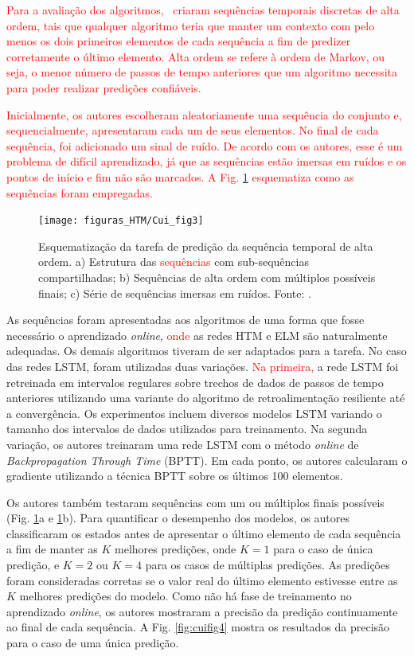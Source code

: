 \textcolor{red}{Para a avaliação dos algoritmos, \cui \ criaram sequências temporais discretas de alta ordem, tais que qualquer algoritmo teria que manter um contexto com pelo menos os dois primeiros elementos de cada  sequência a fim de predizer corretamente o último elemento. Alta ordem se refere à ordem de Markov, ou seja, o menor número de passos de tempo anteriores que um algoritmo necessita para poder realizar predições confiáveis.}

\textcolor{red}{Inicialmente, os autores escolheram aleatoriamente uma sequência do conjunto e, sequencialmente, apresentaram cada um de seus elementos. No final de cada sequência, foi adicionado um sinal de ruído. De acordo com os autores, esse é um problema de difícil aprendizado, já que as sequências estão imersas em ruídos e os pontos de início e fim não são marcados. A Fig. \ref{fig:cuifig3} esquematiza como as sequências foram empregadas.}

\begin{figure}[H]
	\centering
	\texttt{[image: figuras\_HTM/Cui\_fig3]}
	\caption{Esquematização da tarefa de predição da sequência temporal de alta ordem. a) Estrutura das \textcolor{red}{sequências} com sub-sequências compartilhadas; b) Sequências de alta ordem com múltiplos possíveis finais; c) Série de sequências imersas em ruídos. Fonte: \cui.}
	\label{fig:cuifig3}
\end{figure}

As sequências foram apresentadas aos algoritmos de uma forma que fosse necessário o aprendizado \textit{online}, \textcolor{red}{onde} as redes HTM e ELM são naturalmente adequadas. Os demais algoritmos tiveram de ser adaptados para a tarefa. No caso das redes LSTM, foram utilizadas duas variações. \textcolor{red}{Na primeira,} a rede LSTM foi retreinada em intervalos regulares sobre trechos de dados de passos de tempo anteriores utilizando uma variante do algoritmo de retroalimentação resiliente até a convergência. Os experimentos incluem diversos modelos LSTM variando o tamanho dos intervalos de dados utilizados para treinamento. Na segunda variação, os autores treinaram uma rede LSTM com o método \textit{online} de \textit{Backpropagation Through Time} (BPTT). Em cada ponto, os autores calcularam o gradiente utilizando a técnica BPTT sobre os últimos 100 elementos.

Os autores também testaram sequências com um ou múltiplos finais possíveis (Fig. \ref{fig:cuifig3}a e \ref{fig:cuifig3}b). Para quantificar o desempenho dos modelos, os autores classificaram os estados antes de apresentar o último elemento de cada sequência a fim de manter as $K$ melhores predições, onde $K=1$ para o caso de única predição, e $K=2$ ou $K=4$ para os casos de múltiplas predições.  As predições foram consideradas corretas se o valor real do último elemento estivesse entre as $K$ melhores predições do modelo. Como não há fase de treinamento no aprendizado \textit{online}, os autores mostraram a precisão da predição continuamente ao final de cada sequência. A Fig. \ref{fig:cuifig4} mostra os resultados da precisão para o caso de uma única predição. 

